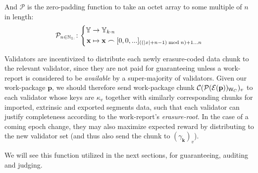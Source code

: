 And $\mathcal{P}$ is the zero-padding function to take an octet array to some multiple of $n$ in length:
\begin{equation}\label{eq:zeropadding}
  \mathcal{P}_{n \in \N_{1:}}\colon\left\{\begin{aligned}
    \Y &\to \Y_{k\cdot n}\\
    \mathbf{x} &\mapsto \mathbf{x} \concat [0, 0, ...]_{((|x|+n - 1) \bmod n) + 1 \dots n}
  \end{aligned}\right.
\end{equation}

Validators are incentivized to distribute each newly erasure-coded data chunk to the relevant validator, since they are not paid for guaranteeing unless a work-report is considered to be \emph{available} by a super-majority of validators. Given our work-package $\mathbf{p}$, we should therefore send work-package chunk $\mathcal{C}(\mathcal{P}(\mathcal{E}(\mathbf{p}))_{\mathsf{W}_C})_v$ to each validator whose keys are $\kappa_v$ together with similarly corresponding chunks for imported, extrinsic and exported segments data, such that each validator can justify completeness according to the work-report's \emph{erasure-root}. In the case of a coming epoch change, they may also maximize expected reward by distributing to the new validator set (and thus also send the chunk to $(\gamma_\mathbf{k})_v$).

We will see this function utilized in the next sections, for guaranteeing, auditing and judging.
